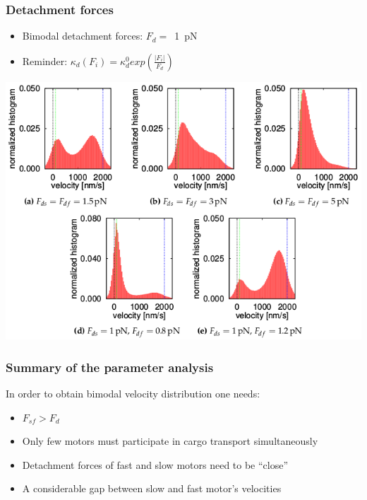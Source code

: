\documentclass[11pt]{beamer}
\begin{document}
\begin{frame}
 \frametitle{Detachment forces}
 \begin{itemize}
  \item 
    Bimodal detachment forces: \mbox{$F_{d} = $ \SI{1}{\pico\newton}}
  \item
    Reminder: $\kappa_d\left(F_i\right) = \kappa_d^0 exp\left(\frac{\vert F_i\vert}{F_d}\right)$
 \end{itemize}
 \begin{center}
  \includegraphics[scale=.4]{img/Fd.png}
 \end{center}

\end{frame}

\begin{frame}
 \frametitle{Summary of the parameter analysis}
 In order to obtain bimodal velocity distribution one needs:
 \begin{itemize}
  \item $F_{sf} > F_d$ \pause
  \item Only few motors must participate in cargo transport simultaneously \pause
  \item Detachment forces of fast and slow motors need to be ``close'' \pause
  \item A considerable gap between slow and fast motor's velocities
 \end{itemize}

\end{frame}
\end{document}

